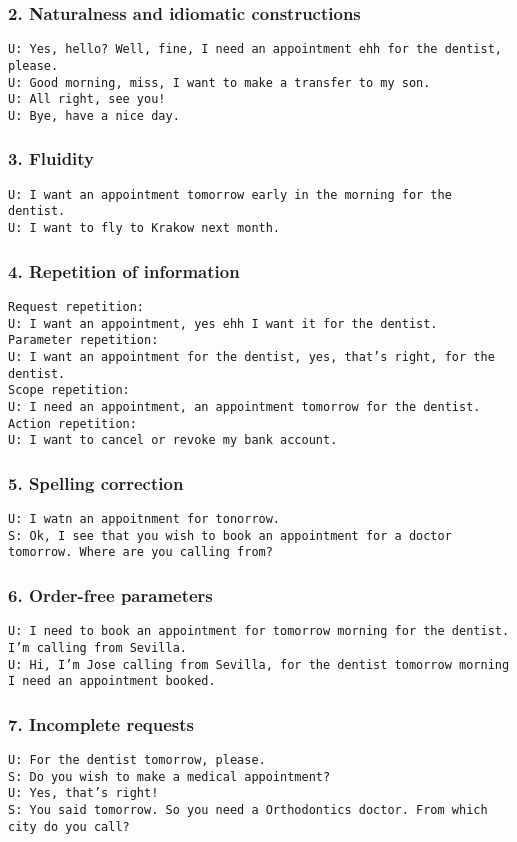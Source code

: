 \documentclass[11pt]{beamer}
\newcommand{\system}[1]{{\color{red}\texttt{S: #1}}\\}
\newcommand{\user}[1]{{\color{teal}\texttt{U: #1}}\\}
\newcommand{\comment}[1]{{\color{orange}\texttt{#1}}\\}
\begin{document}
\begin{frame}
\frametitle{2. Naturalness and idiomatic constructions}
\user{Yes, hello? Well, fine, I need an appointment ehh for the dentist, please.}
\vspace{10pt}
\user{Good morning, miss, I want to make a transfer to my son.}
\vspace{10pt}
\user{All right, see you!}
\vspace{10pt}
\user{Bye, have a nice day.}
\end{frame}

\begin{frame}
\frametitle{3. Fluidity}
\user{I want an appointment tomorrow early in the morning for the dentist.}
\vspace{10pt}
\user{I want to fly to Krakow next month.}
\end{frame}

\begin{frame}
\frametitle{4. Repetition of information}
\comment{Request repetition:}
\user{I want an appointment, yes ehh I want it for the dentist.}
\vspace{10pt}
\comment{Parameter repetition:}
\user{I want an appointment for the dentist, yes, that's right, for the dentist.}
\vspace{10pt}
\comment{Scope repetition:}
\user{I need an appointment, an appointment tomorrow for the dentist. }
\vspace{10pt}
\comment{Action repetition:}
\user{I want to cancel or revoke my bank account. }
\end{frame}

\begin{frame}
\frametitle{5. Spelling correction}
\user{I watn an appoitnment for tonorrow.}
\system{Ok, I see that you wish to book an appointment for a doctor tomorrow. Where are you calling from?}
\end{frame}

\begin{frame}
\frametitle{6. Order-free parameters}
\user{I need to book an appointment for tomorrow morning for the dentist. I'm calling from Sevilla.}
\vspace{10pt}
\user{Hi, I'm Jose calling from Sevilla, for the dentist tomorrow morning I need an appointment booked.}
\end{frame}

\begin{frame}
\frametitle{7. Incomplete requests}
\user{For the dentist tomorrow, please.}
\system{Do you wish to make a medical appointment?}
\user{Yes, that's right!}
\system{You said tomorrow. So you need a Orthodontics doctor. From which city do you call?}
\end{frame}
\end{document}
